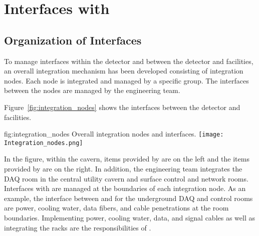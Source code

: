 \chapter{Interfaces with }
\label{vl:tc-lbnf}

\section{Organization of Interfaces}
\label{sec:inter-org-interf}
To manage interfaces within the detector and between the
detector and facilities, an overall integration mechanism has been
developed consisting of integration nodes. Each node is integrated
and managed by a specific group. The interfaces between the nodes are
managed by the  engineering team.

Figure~\ref{fig:integration_nodes} shows the interfaces between the
detector and facilities.
\begin{dunefigure}{fig:integration_nodes}
  {Overall integration nodes and interfaces.}
  \texttt{[image: Integration\_nodes.png]}
\end{dunefigure}
In the figure, within the cavern, items provided by  are
on the left and the items provided by  are on the right. In addition, the  engineering team integrates the DAQ room in the central utility
cavern and surface control and network rooms. Interfaces with  are
managed at the boundaries of each integration node. As an example, the
interface between  and  for the underground DAQ and control
rooms are power, cooling water, data fibers, and cable penetrations at the
room boundaries. Implementing power, cooling water, data, and
signal cables as well as integrating the racks are the responsibilities of .


